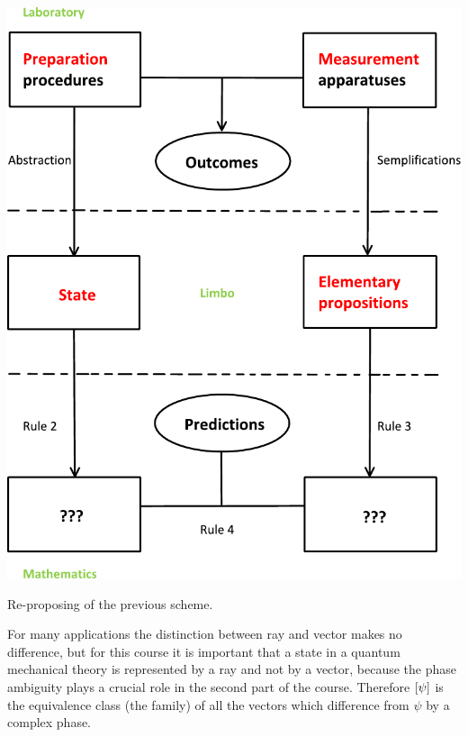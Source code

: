 \documentclass[../main.tex]{subfiles}
\begin{document}
\begin{marginfigure}
	\includegraphics[width=1.1\linewidth]{images/Schema_Phys_theory.pdf}
	\caption[Schema Phys theory small]{Re-proposing of the previous scheme.}
\end{marginfigure}
For many applications the distinction between ray and vector makes no difference, but for this course it is important that a state in a quantum mechanical theory is represented by a ray and not by a vector, because the phase ambiguity plays a crucial role in the second part of the course. Therefore $\qty[\psi]$ is the equivalence class (the family) of all the vectors which difference from $\psi$ by a complex phase.
\end{document}
